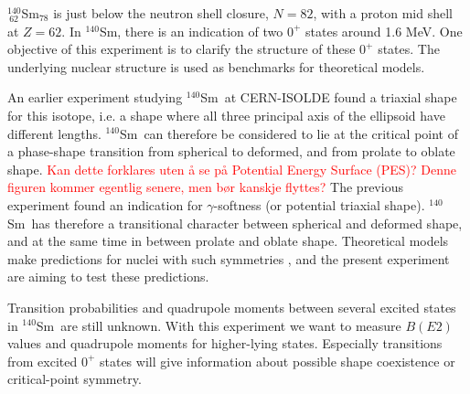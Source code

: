 \documentclass[twoside,english]{uiofysmaster/uiofysmaster}
\newcommand{\Sm}{$^{140}$Sm} %
\newcommand{\ga}{$\gamma$}
\begin{document}
$^{140}_{~62}$Sm$_{78}$ is just below the neutron shell closure, $N = 82$, with a proton mid shell at $Z = 62$. 
In \Sm, there is an indication of two $0^+$ states around 1.6 MeV. 
One objective of this experiment is to clarify the structure of these $0^+$ states. 
The underlying nuclear structure is used as benchmarks for theoretical models.

An earlier experiment studying \Sm\ at CERN-ISOLDE found a triaxial shape for this isotope, i.e. a shape where all three principal axis of the ellipsoid have different lengths.
\Sm\ can therefore be considered to lie at the critical point of a phase-shape transition from spherical to deformed, and from prolate to oblate shape.
\textcolor{red}{Kan dette forklares uten å se på Potential Energy Surface (PES)? Denne figuren kommer egentlig senere, men bør kanskje flyttes?}
The previous experiment found an indication for \ga-softness (or potential triaxial shape). 
\Sm\ has therefore a transitional character between spherical and deformed shape, and at the same time in between prolate and oblate shape.
Theoretical models make predictions for nuclei with such symmetries \cite{Iachello2000}, and the present experiment are aiming to test these predictions.

Transition probabilities and quadrupole moments between several excited states in \Sm\ are still unknown.
With this experiment we want to measure $B(E2)$ values and quadrupole moments for higher-lying states.
Especially transitions from excited $0^+$ states will give information about possible shape coexistence or critical-point symmetry. 
\end{document}
